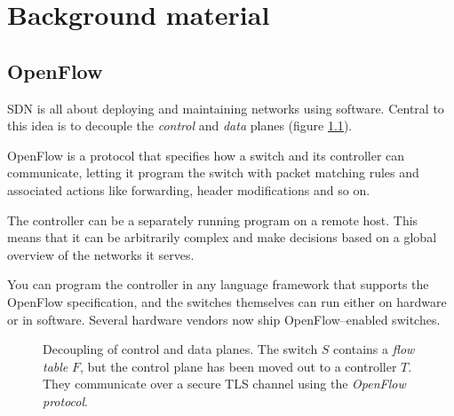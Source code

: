 \chapter{Background material}

\section{OpenFlow}

\acf{SDN} is all about deploying and maintaining networks using software.
Central to this idea is to decouple the \textit{control} and \textit{data}
planes (figure \ref{figure:decoupling.planes}).

OpenFlow is a protocol that specifies how a switch and its controller can
communicate, letting it program the switch with packet matching rules and
associated actions like forwarding, header modifications and so on.

The controller can be a separately running program on a remote host. This
means that it can be arbitrarily complex and make decisions based on a
global overview of the networks it serves.

You can program the controller in any language framework that supports the
OpenFlow specification, and the switches themselves can run either on
hardware or in software.  Several hardware vendors now ship
OpenFlow--enabled switches.

\begin{figure}
  \centering
  \caption{Decoupling of control and data planes.  The switch $S$ contains a
    \textit{flow table} $F$, but the control plane has been moved
      out to a controller $T$.  They communicate over a secure \acs{TLS}
    channel using the \textit{OpenFlow protocol}.}
  \label{figure:decoupling.planes}
\end{figure}

